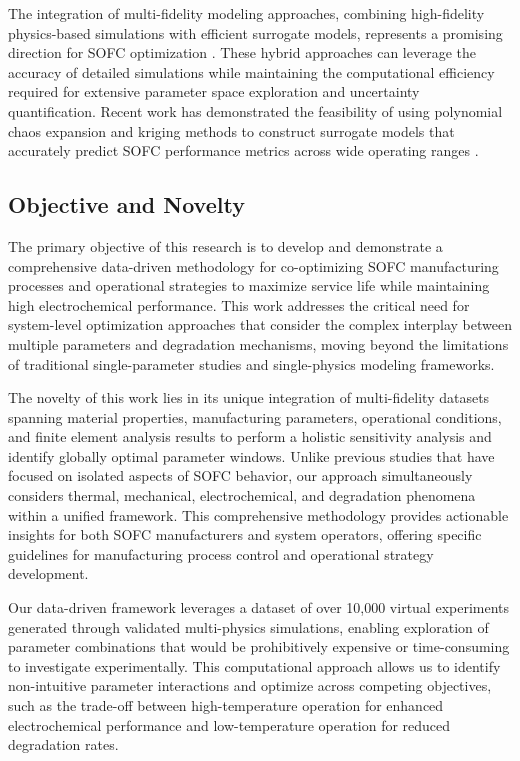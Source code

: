 \documentclass[conference]{IEEEtran}
\begin{document}
The integration of multi-fidelity modeling approaches, combining high-fidelity physics-based simulations with efficient surrogate models, represents a promising direction for SOFC optimization \cite{ma2024surrogate}. These hybrid approaches can leverage the accuracy of detailed simulations while maintaining the computational efficiency required for extensive parameter space exploration and uncertainty quantification. Recent work has demonstrated the feasibility of using polynomial chaos expansion and kriging methods to construct surrogate models that accurately predict SOFC performance metrics across wide operating ranges \cite{navasa2024uncertainty}.

\subsection{Objective and Novelty}

The primary objective of this research is to develop and demonstrate a comprehensive data-driven methodology for co-optimizing SOFC manufacturing processes and operational strategies to maximize service life while maintaining high electrochemical performance. This work addresses the critical need for system-level optimization approaches that consider the complex interplay between multiple parameters and degradation mechanisms, moving beyond the limitations of traditional single-parameter studies and single-physics modeling frameworks.

The novelty of this work lies in its unique integration of multi-fidelity datasets spanning material properties, manufacturing parameters, operational conditions, and finite element analysis results to perform a holistic sensitivity analysis and identify globally optimal parameter windows. Unlike previous studies that have focused on isolated aspects of SOFC behavior, our approach simultaneously considers thermal, mechanical, electrochemical, and degradation phenomena within a unified framework. This comprehensive methodology provides actionable insights for both SOFC manufacturers and system operators, offering specific guidelines for manufacturing process control and operational strategy development.

Our data-driven framework leverages a dataset of over 10,000 virtual experiments generated through validated multi-physics simulations, enabling exploration of parameter combinations that would be prohibitively expensive or time-consuming to investigate experimentally. This computational approach allows us to identify non-intuitive parameter interactions and optimize across competing objectives, such as the trade-off between high-temperature operation for enhanced electrochemical performance and low-temperature operation for reduced degradation rates.
\end{document}
